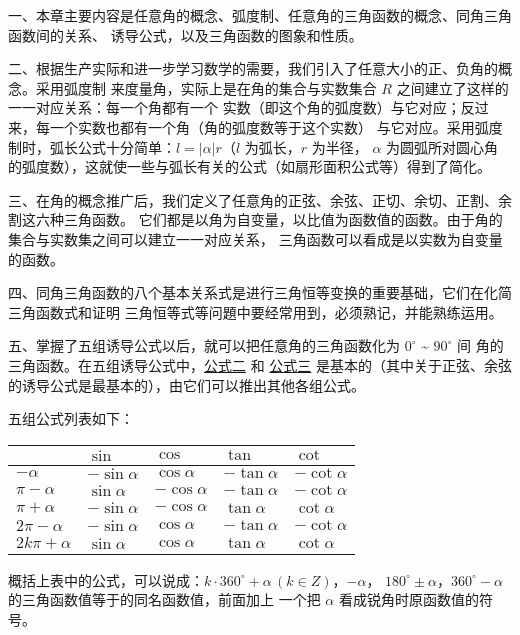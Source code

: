 \xiaojie

一、本章主要内容是任意角的概念、弧度制、任意角的三角函数的概念、同角三角函数间的关系、
诱导公式，以及三角函数的图象和性质。

二、根据生产实际和进一步学习数学的需要，我们引入了任意大小的正、负角的概念。采用弧度制
来度量角，实际上是在角的集合与实数集合 $R$ 之间建立了这样的一一对应关系：每一个角都有一个
实数（即这个角的弧度数）与它对应；反过来，每一个实数也都有一个角（角的弧度数等于这个实数）
与它对应。采用弧度制时，弧长公式十分简单：$l = |\alpha| r$（$l$ 为弧长，$r$ 为半径，
$\alpha$ 为圆弧所对圆心角的弧度数），这就使一些与弧长有关的公式（如扇形面积公式等）得到了简化。

三、在角的概念推广后，我们定义了任意角的正弦、余弦、正切、余切、正割、余割这六种三角函数。
它们都是以角为自变量，以比值为函数值的函数。由于角的集合与实数集之间可以建立一一对应关系，
三角函数可以看成是以实数为自变量的函数。

四、同角三角函数的八个基本关系式是进行三角恒等变换的重要基础，它们在化简三角函数式和证明
三角恒等式等问題中要经常用到，必须熟记，并能熟练运用。

五、掌握了五组诱导公式以后，就可以把任意角的三角函数化为 $0^\circ$ \~{} $90^\circ$ 间
角的三角函数。在五组诱导公式中，\hyperref[gongshi:2]{公式二} 和 \hyperref[gongshi:3]{公式三}
是基本的（其中关于正弦、余弦的诱导公式是最基本的），由它们可以推出其他各组公式。

五组公式列表如下：

\begin{table}[H]
\begin{tabular}{|w{c}{5em}|*{4}{w{c}{4em}|}}
    \hline
     & $\sin$ & $\cos$ & $\tan$ & $\cot$ \\ \hline
    $-\alpha$ & $-\sin\alpha$ & $\cos\alpha$ & $-\tan\alpha$ & $-\cot\alpha$ \\ \hline
    $\pi - \alpha$ & $\sin\alpha$ & $-\cos\alpha$ & $-\tan\alpha$ & $-\cot\alpha$ \\ \hline
    $\pi + \alpha$ & $-\sin\alpha$ & $-\cos\alpha$ & $\tan\alpha$ & $\cot\alpha$ \\ \hline
    $2\pi -\alpha$ & $-\sin\alpha$ & $\cos\alpha$ & $-\tan\alpha$ & $-\cot\alpha$ \\ \hline
    $2k\pi +\alpha$ & $\sin\alpha$ & $\cos\alpha$ & $\tan\alpha$ & $\cot\alpha$ \\ \hline
\end{tabular}
\end{table}

概括上表中的公式，可以说成：$k \cdot 360^\circ + \alpha \, (k \in Z)$，$-\alpha$，
$180^\circ \pm \alpha$，$360^\circ - \alpha$ 的三角函数值等于的同名函数值，前面加上
一个把 $\alpha$ 看成锐角时原函数值的符号。

